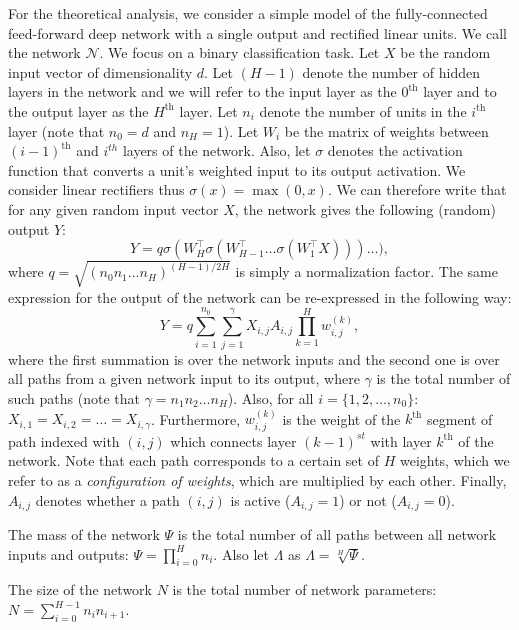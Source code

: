 \documentclass[twoside]{article}
\begin{document}
For the theoretical analysis, we consider a simple model of the fully-connected feed-forward deep network with a single output and rectified linear units. We call the network $\mathcal{N}$. We focus on a binary classification task. Let $X$ be the random input vector of dimensionality $d$. Let $(H-1)$ denote the number of hidden layers in the network and we will refer to the input layer as the $0^{\text{th}}$ layer and to the output layer as the $H^{\text{th}}$ layer. Let $n_i$ denote the number of units in the $i^{\text{th}}$ layer (note that $n_0 = d$ and $n_H = 1$). Let $W_i$ be the matrix of weights between $(i - 1)^{\text{th}}$ and $i^{th}$ layers of the network. Also, let $\sigma$ denotes the activation function that converts a unit's weighted input to its output activation. We consider linear rectifiers thus $\sigma(x) = \max(0,x)$. We can therefore write that for any given random input vector $X$, the network gives the following (random) output $Y$:
\[Y = q\sigma(W_H^{\top}\sigma(W_{H-1}^{\top}\dots\sigma(W_1^{\top}X)))\dots),
\]
where $q = \sqrt{(n_0n_1...n_H)^{(H-1)/2H}}$ is simply a normalization factor. The same expression for the output of the network can be re-expressed in the following way:
\begin{equation}
Y = q\sum_{i=1}^{n_0}\sum_{j = 1}^\gamma X_{i,j}A_{i,j}\prod_{k = 1}^{H}w_{i,j}^{(k)},
\label{eq:befrein}
\end{equation}
where the first summation is over the network inputs and the second one is over all paths from a given network input to its output, where $\gamma$ is the total number of such paths (note that $\gamma = n_1n_2\dots n_H$). Also, for all $i = \{1,2,\dots,n_0\}$: $X_{i,1} = X_{i,2} = \dots = X_{i,\gamma}$. Furthermore, $w_{i,j}^{(k)}$ is the weight of the $k^{\text{th}}$ segment of path indexed with $(i,j)$ which connects layer $(k-1)^{st}$ with layer $k^{\text{th}}$ of the network. Note that each path corresponds to a certain set of $H$ weights, which we refer to as a \textit{configuration of weights}, which are multiplied by each other. Finally, $A_{i,j}$ denotes whether a path $(i,j)$ is active ($A_{i,j} = 1$) or not ($A_{i,j} = 0$). 

\begin{definition}
The mass of the network $\Psi$ is the total number of all paths between all network inputs and outputs: $\Psi = \prod_{i=0}^Hn_i$. Also let $\Lambda$ as $\Lambda = \sqrt[H]{\Psi}$.
\end{definition}

\begin{definition}
The size of the network $N$ is the total number of network parameters: $N = \sum_{i=0}^{H-1}n_in_{i+1}$.
\end{definition}
\end{document}
